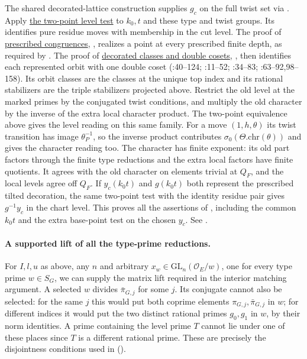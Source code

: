 The shared decorated-lattice construction supplies $g_c$ on the full
twist set via .
Apply \hyperref[r13:s9-twopoints]{the two-point level test} to $k_0,t$ and these
type and twist groups. Its 
identifies pure residue moves with membership in the cut level.
The proof of \hyperref[r13:s9-congruence]{prescribed congruences}, ,
realizes a point at every prescribed finite depth, as required by
. The proof of \hyperref[r13:s9-cosets]{decorated classes and double cosets},
, then identifies each
represented orbit with one double coset
(:40--124;
:11--52;
:34--83;
:63--92,98--158). Its orbit classes
are the classes at the unique top index and its rational stabilizers
are the triple stabilizers projected above. Restrict the old level
at the marked primes by the conjugated twist conditions, and multiply
the old character by the inverse of the extra local character product.
The two-point equivalence above gives the level reading on this same family.
For a move $(1,h,\theta)$ its twist transition has image
$\theta_P^{-1}$, so the inverse product contributes
$\sigma_0(\Theta.\mathrm{chr}(\theta))$ and gives the character
reading too. The character has finite exponent: its old part
factors through the finite type reductions and the extra local
factors have finite quotients. It agrees with the old character on
elements trivial at $Q_F$, and the local levels agree off $Q_F$.
If $y_c(k_0t)$ and $g(k_0t)$ both represent the prescribed tilted
decoration, the same two-point test with the identity residue pair
gives $g^{-1}y_c$ in the chart level. This proves all the assertions of
, including the
common $k_0t$ and the extra base-point test on the chosen $y_c$.
See .

\paragraph{A supported lift of all the type-prime reductions.}
For $I,l,u$ as above, any $n$ and arbitrary
$x_w\in\mathrm{GL}_n(\mathcal O_E/w)$, one for every type prime
$w\in S_G$, we can supply the matrix lift required in the interior
matching argument. A selected $w$ divides $\bar\pi_{G,j}$ for some $j$.
Its conjugate cannot also be selected: for the same $j$ this would
put both coprime elements $\pi_{G,j},\bar\pi_{G,j}$ in $w$; for
different indices it would put the two distinct rational primes
$g_0,g_1$ in $w$, by their norm identities. A prime containing the
level prime $T$ cannot lie under one of these places since $T$ is a
different rational prime. These are precisely the disjointness
conditions used in 
().

